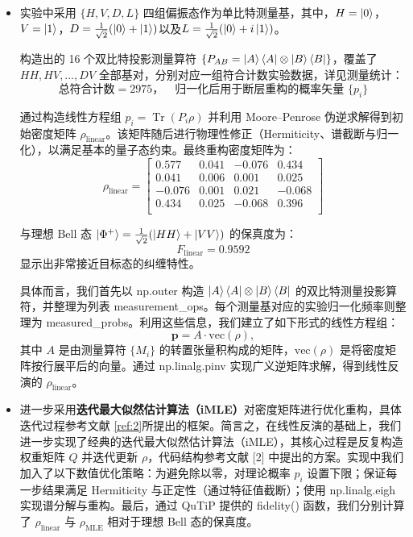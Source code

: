 \begin{itemize}
	\item 实验中采用 $\{H, V, D, L\}$ 四组偏振态作为单比特测量基，其中，$H = \ket{0}$，$V = \ket{1}$，$D = \frac{1}{\sqrt{2}}(\ket{0} + \ket{1})$以及$L = \frac{1}{\sqrt{2}}(\ket{0} + i\ket{1})$。
	
	构造出的 16 个双比特投影测量算符 $\{P_{AB} = \ket{A}\bra{A} \otimes \ket{B}\bra{B}\}$，覆盖了 $HH, HV, \dots, DV$ 全部基对，分别对应一组符合计数实验数据，详见测量统计：
	\[
	\text{总符合计数} = 2975，\quad \text{归一化后用于断层重构的概率矢量 } \{p_i\}
	\]
	
	通过构造线性方程组 $p_i = \operatorname{Tr}(P_i \rho)$ 并利用 Moore–Penrose 伪逆求解得到初始密度矩阵 $\rho_{\text{linear}}$。该矩阵随后进行物理性修正（Hermiticity、谱截断与归一化），以满足基本的量子态约束。最终重构密度矩阵为：
	\[
	\rho_{\text{linear}} =
	\begin{bmatrix}
		0.577 & 0.041 & -0.076 & 0.434 \\
		0.041 & 0.006 & 0.001 & 0.025 \\
		-0.076 & 0.001 & 0.021 & -0.068 \\
		0.434 & 0.025 & -0.068 & 0.396 \\
	\end{bmatrix}
	\]
	
	与理想 Bell 态 $\ket{\Phi^+} = \frac{1}{\sqrt{2}}(\ket{HH} + \ket{VV})$ 的保真度为：
	\[
	F_{\text{linear}} = 0.9592
	\]
	显示出非常接近目标态的纠缠特性。
	
	具体而言，我们首先以 np.outer 构造 $\ket{A}\bra{A} \otimes \ket{B}\bra{B}$ 的双比特测量投影算符，并整理为列表 measurement\_ops。每个测量基对应的实验归一化频率则整理为 measured\_probs。利用这些信息，我们建立了如下形式的线性方程组：
	\[
	\mathbf{p} = A \cdot \text{vec}(\rho),
	\]
	其中 $A$ 是由测量算符 $\{M_i\}$ 的转置张量积构成的矩阵，$\text{vec}(\rho)$ 是将密度矩阵按行展平后的向量。通过 np.linalg.pinv 实现广义逆矩阵求解，得到线性反演的 $\rho_{\text{linear}}$。
	
	\item 进一步采用\textbf{迭代最大似然估计算法（iMLE）}对密度矩阵进行优化重构，具体迭代过程参考文献 \cref{ref:2}所提出的框架。简言之，在线性反演的基础上，我们进一步实现了经典的迭代最大似然估计算法（iMLE），其核心过程是反复构造权重矩阵 $Q$ 并迭代更新 $\rho$，代码结构参考文献 [2] 中提出的方案。实现中我们加入了以下数值优化策略：为避免除以零，对理论概率 $p_i$ 设置下限；保证每一步结果满足 Hermiticity 与正定性（通过特征值截断）；使用 np.linalg.eigh 实现谱分解与重构。最后，通过 QuTiP 提供的 fidelity() 函数，我们分别计算了 $\rho_{\text{linear}}$ 与 $\rho_{\text{MLE}}$ 相对于理想 Bell 态的保真度。
	

\end{itemize}
